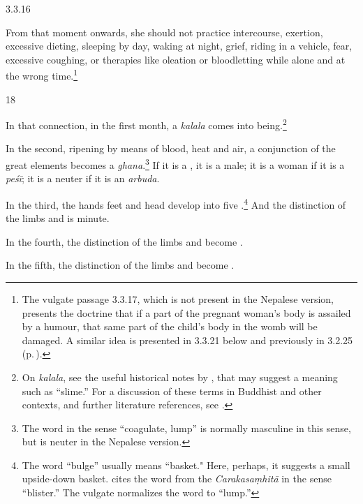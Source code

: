 \begin{translation}
\item[3.3.16]

From that moment onwards, she should not practice intercourse,
exertion, excessive dieting, sleeping by day, waking at night, grief,
riding in a vehicle, fear, excessive coughing, or therapies like
oleation or bloodletting while alone and at the wrong
time.\footnote{The vulgate passage 3.3.17, which is not present in the
    Nepalese version, presents the doctrine that if a part of the pregnant
    woman's body is assailed by a humour, that same part of the child's
    body in the womb will be damaged.  A similar idea is presented in 
    3.3.21 below and previously in 3.2.25 (p.\,\pageref{3.2.25}).}


\item [18]

In that connection, in the first month, a \emph{kalala} comes into
being.\footnote{On \emph{kalala}, see the useful historical notes by
    \citet[535--536]{das-2003}, that may suggest a meaning such as
    “slime.”  For a discussion of these terms in Buddhist and other
    contexts, and further literature references, see
    \cite{agos-2004,krit-2013,krit-2009,sune-1991}. }
    
In the second, ripening by means of blood, heat and air, a conjunction
of the great elements becomes a \emph{ghana}.\footnote{The word
     in the sense “coagulate, lump” is normally masculine in
    this sense, but is neuter in the Nepalese version.}  If it is a
    , it is a male; it is a woman if it is a
    \emph{peśī}; it is a neuter if it is an \emph{arbuda}.
        
In the third, the hands feet and head develop into five
.\footnote{The word  “bulge” usually
    means “basket."  Here, perhaps, it suggests a small upside-down
    basket. \cite[652]{moni-sans} cites the word from the
    \emph{Carakasaṃhitā} in the sense “blister.”  The vulgate normalizes
    the word to  “lump.”}  And the distinction of the limbs
    and  is minute.
        
In the fourth, the distinction of the limbs and  become .  
    
In the fifth, the distinction of the limbs and  become .
        




\end{translation}
